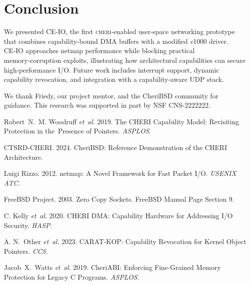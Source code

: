 \documentclass[sigconf]{acmart}
\newcommand{\cheri}{\textsc{cheri}\xspace}
\newcommand{\e}{\textit{e}1000\xspace}
\begin{document}
\section{Conclusion}
\label{sec:conclusion}
We presented CE‑IO, the first \cheri‑enabled user‑space networking prototype that combines capability-bound DMA buffers with a modified \e driver. CE‑IO approaches netmap performance while blocking practical memory‑corruption exploits, illustrating how architectural capabilities can secure high‑performance I/O. Future work includes interrupt support, dynamic capability revocation, and integration with a capability‑aware UDP stack.

\begin{acks}
We thank Friedy, our project mentor, and the CheriBSD community for guidance. This research was supported in part by NSF CNS-2222222.
\end{acks}

\balance

\begin{thebibliography}{00}

Robert N. M. Woodruff \emph{et al.} 2019. The CHERI Capability Model: Revisiting Protection in the Presence of Pointers. \emph{ASPLOS}.

CTSRD‑CHERI. 2024. CheriBSD: Reference Demonstration of the CHERI Architecture.

Luigi Rizzo. 2012. netmap: A Novel Framework for Fast Packet I/O. \emph{USENIX ATC}.

FreeBSD Project. 2003. Zero Copy Sockets. FreeBSD Manual Page Section 9.

C. Kelly \emph{et al.} 2020. CHERI DMA: Capability Hardware for Addressing I/O Security. \emph{HASP}.

A. N. Other \emph{et al.} 2023. CARAT‑KOP: Capability Revocation for Kernel Object Pointers. \emph{CCS}.

Jacob X. Watts \emph{et al.} 2019. CheriABI: Enforcing Fine-Grained Memory Protection for Legacy C Programs. \emph{ASPLOS}.

\end{thebibliography}
\end{document}

